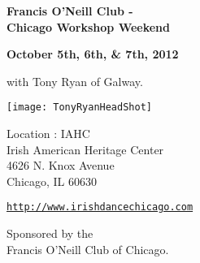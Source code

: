 \begin{center}
{\Large\textbf{Francis O'Neill Club - \\ Chicago Workshop Weekend}}\\ 
\end{center}

\begin{center}
\textbf{October 5th, 6th, \&  7th, 2012} 


\vspace*{0.25em}
with Tony Ryan of Galway.
\end{center}

\vspace*{0.45em}
\begin{center}
\texttt{[image: TonyRyanHeadShot]}
\end{center}

\vspace*{2.5em}
Location : IAHC\\
Irish American Heritage Center\\
4626 N. Knox Avenue\\
Chicago, IL  60630 

\begin{center}
\vspace*{2em}
\href{http://www.irishdancechicago.com}{\tt http://www.irishdancechicago.com} 

{\small Sponsored by the \\Francis O'Neill Club of Chicago.}
\end{center}
